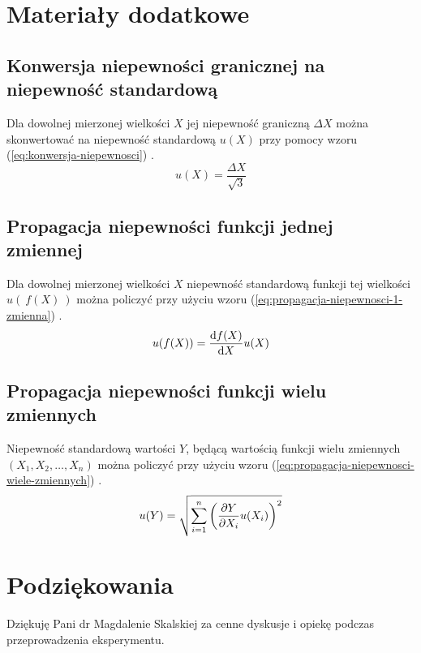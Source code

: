 \documentclass[twocolumn, a4paper, polish, 10pt]{article}
\begin{document}
\section{Materiały dodatkowe}
\subsection{Konwersja niepewności granicznej na niepewność standardową}
Dla dowolnej mierzonej wielkości $X$ jej niepewność graniczną $\Delta X$ można skonwertować na niepewność standardową $u(X)$ przy pomocy wzoru (\ref{eq:konwersja-niepewnosci}) \cite{smop-wyklad}.
\begin{equation}
    u(X) = \frac{ \Delta X }{ \sqrt{3} }
    \label{eq:konwersja-niepewnosci}
\end{equation}

\subsection{Propagacja niepewności funkcji jednej zmiennej}
Dla dowolnej mierzonej wielkości $X$ niepewność standardową funkcji tej wielkości $u(~f(X)~)$ można policzyć przy użyciu wzoru (\ref{eq:propagacja-niepewnosci-1-zmienna}) \cite{smop-wyklad}.
\begin{equation}
    u( f(X) ) = \dv{f(X)}{X} u(X)
    \label{eq:propagacja-niepewnosci-1-zmienna}
\end{equation}

\subsection{Propagacja niepewności funkcji wielu zmiennych}
Niepewność standardową wartości $Y$, będącą wartością funkcji wielu zmiennych $(X_1, X_2, \dots, X_n)$ można policzyć przy użyciu wzoru (\ref{eq:propagacja-niepewnosci-wiele-zmiennych}) \cite{smop-wyklad}.
\begin{equation}
    u(Y) = \sqrt{ \sum_{i=1}^n \left( \pdv{Y}{X_i} u(X_i) \right)^2 }
    \label{eq:propagacja-niepewnosci-wiele-zmiennych}
\end{equation}

\section{Podziękowania}
Dziękuję Pani dr Magdalenie Skalskiej za cenne dyskusje i opiekę podczas przeprowadzenia eksperymentu.
\end{document}
